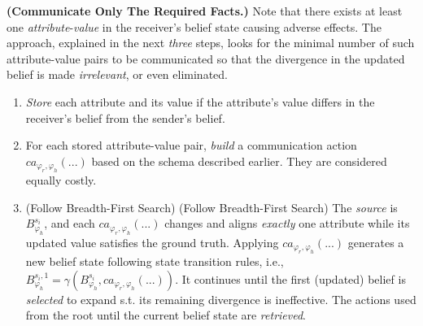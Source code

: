 \documentclass[letterpaper]{article} %
\begin{document}
\noindent \textbf{(Communicate Only The Required Facts.)}
Note that there exists at least one \textit{attribute}-\textit{value} in the receiver's belief state causing adverse effects. 
The approach, explained in the next \textit{three} steps, looks for the minimal number of such attribute-value pairs to be communicated so that
the divergence in the updated belief is made \textit{irrelevant}, or even eliminated.
\begin{enumerate}
    \item 
    \textit{Store} each attribute and its value if the attribute's value differs in the receiver's belief from the sender's belief. 

    \item For each stored attribute-value pair, \textit{build} a communication action $ca_{\varphi_r, \varphi_h}(...)$ based on the schema described earlier. They are considered equally costly.
    
    \item 
    (Follow Breadth-First Search) 
    (Follow Breadth-First Search) 
    The \textit{source} is $B_{\varphi_h}^{s_i}$, and each $ca_{\varphi_r, \varphi_h}(...)$ changes and aligns \textit{exactly} one attribute while its updated value satisfies the ground truth. 
    Applying $ca_{\varphi_r, \varphi_h}(...)$ generates a new belief state following state transition rules, i.e., $B_{\varphi_h}^{s_i,1} = \gamma(B_{\varphi_h}^{s_i}, ca_{\varphi_r, \varphi_h}(...))$.
    It continues until the first (updated) belief is \textit{selected} to expand s.t. its remaining divergence is ineffective. The actions used from the root until the current belief state are \textit{retrieved}.
\end{enumerate}
\end{document}
